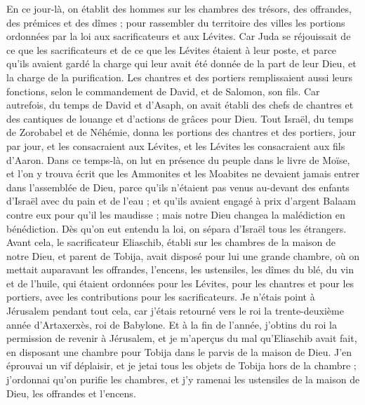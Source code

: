 \begin{multicols}{2}
En ce jour-là, on établit des hommes sur les chambres des trésors, des offrandes, des prémices et des dîmes ; pour rassembler du territoire des villes les portions ordonnées par la loi aux sacrificateurs et aux Lévites. Car Juda se réjouissait de ce que les sacrificateurs et  de ce que les Lévites étaient à leur poste,
et parce qu'ils avaient gardé la charge qui leur avait été donnée de la part de leur Dieu, et la charge de la purification. Les chantres et des portiers remplissaient aussi leurs fonctions, selon le commandement de David, et de Salomon, son fils.
Car autrefois, du temps de David et d'Asaph, on avait établi des chefs de chantres et des cantiques de louange et d'actions de grâces pour Dieu.
Tout Israël, du temps de Zorobabel et de Néhémie, donna les portions des chantres et des portiers, jour par jour, et les consacraient aux Lévites, et les Lévites les consacraient aux fils d'Aaron.
\VerseOne{}Dans ce temps-là, on lut en présence du peuple dans le livre de Moïse, et l’on y trouva écrit que les Ammonites et les Moabites ne devaient jamais  entrer dans l'assemblée de Dieu,
parce qu'ils n'étaient pas venus au-devant des enfants d'Israël avec du pain et de l'eau ; et qu'ils avaient engagé à prix d’argent Balaam  contre eux pour qu'il les maudisse ; mais notre Dieu changea la malédiction en bénédiction.
Dès qu'on eut entendu la loi, on sépara d'Israël tous les étrangers.
Avant cela, le sacrificateur Eliaschib, établi sur les chambres de la maison de notre Dieu, et parent de Tobija,
avait disposé pour lui une grande chambre, où on mettait auparavant les offrandes, l'encens, les ustensiles, les dîmes du blé, du vin et de l'huile, qui étaient ordonnées pour les Lévites, pour les chantres et pour les portiers, avec les contributions pour les sacrificateurs.
Je n'étais point à Jérusalem pendant tout cela, car j’étais retourné vers le roi la trente-deuxième année d'Artaxerxès, roi de Babylone. Et à la fin de l’année, j'obtins du roi la permission
de revenir à Jérusalem, et je m'aperçus du mal qu'Eliaschib avait fait, en disposant une chambre pour Tobija dans le parvis de la maison de Dieu.
J'en éprouvai un vif déplaisir, et je jetai tous les objets de Tobija hors de la chambre ;
j’ordonnai qu’on purifie les chambres, et j'y ramenai les ustensiles de la maison de Dieu, les offrandes et l'encens.

\end{multicols}
